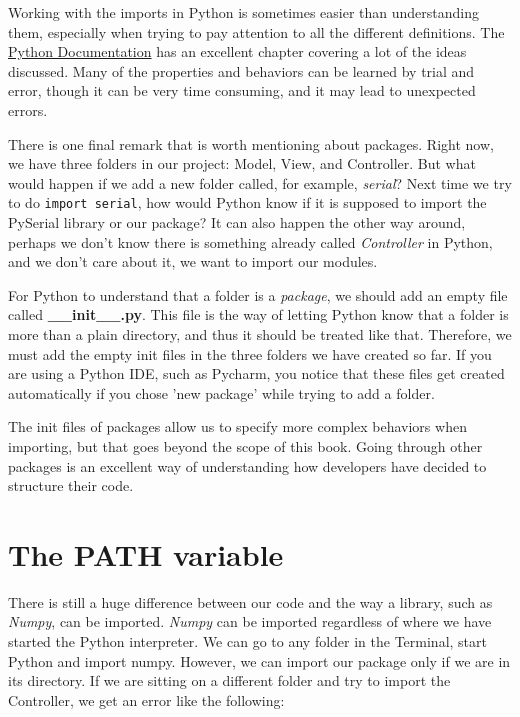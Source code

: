 Working with the imports in Python is sometimes easier than understanding them, especially when trying to pay attention to all the different definitions. The \href{https://docs.python.org/3.6/tutorial/modules.html}{Python Documentation} has an excellent chapter covering a lot of the ideas discussed. Many of the properties and behaviors can be learned by trial and error, though it can be very time consuming, and it may lead to unexpected errors.

There is one final remark that is worth mentioning about packages. Right now, we have three folders in our project: Model, View, and Controller. But what would happen if we add a new folder called, for example, \emph{serial}? Next time we try to do \texttt{import serial}, how would Python know if it is supposed to import the PySerial library or our package? It can also happen the other way around, perhaps we don't know there is something already called \emph{Controller} in Python, and we don't care about it, we want to import our modules.

For Python to understand that a folder is a \emph{package}, we should add an empty file called \textbf{\_\_init\_\_.py}. This file is the way of letting Python know that a folder is more than a plain directory, and thus it should be treated like that. Therefore, we must add the empty init files in the three folders we have created so far. If you are using a Python IDE, such as Pycharm, you notice that these files get created automatically if you chose 'new package' while trying to add a folder.


The init files of packages allow us to specify more complex behaviors when importing, but that goes beyond the scope of this book. Going through other packages is an excellent way of understanding how developers have decided to structure their code.

\section{The PATH variable}\label{sec:path}
There is still a huge difference between our code and the way a library, such as \emph{Numpy}, can be imported. \emph{Numpy} can be imported regardless of where we have started the Python interpreter. We can go to any folder in the Terminal, start Python and import numpy. However, we can import our package only if we are in its directory. If we are sitting on a different folder and try to import the Controller, we get an error like the following:


